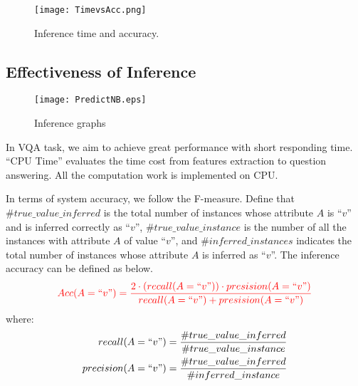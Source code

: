 \begin{figure}[h]
\begin{center}
\texttt{[image: TimevsAcc.png]}
\end{center}
\caption{Inference time and accuracy.}
\label{fig:TimevsAcc}
\end{figure}


\subsection{Effectiveness of Inference} 
\begin{figure}[tb!]
\centering
\texttt{[image: PredictNB.eps]}
\vspace{-2ex}
\caption{Inference graphs}
\vspace{-2ex}
\label{fig:inferGraph}
\end{figure}


In VQA task, we aim to achieve great performance with short responding time. “CPU Time” evaluates the time cost from features extraction to question answering. All the computation work is implemented on CPU.

In terms of system accuracy, we follow the F-measure. Define that $\#true\_value\_inferred$ is the total number of instances whose attribute $A$ is ``$v$'' and is inferred correctly as ``$v$'', $\#true\_value\_instance$ is the number of all the instances with attribute $A$ of value ``$v$'', and $\#inferred\_instances$ indicates the total number of instances whose attribute $A$ is inferred as ``$v$''. The inference accuracy can be defined as below. 
\begin{equation}
\scriptsize
\color{red}
Acc(A=``v") = \frac{2 \cdot (recall(A=``v")) \cdot presision (A = ``v")}{recall(A=``v") + presision (A = ``v")}
\end{equation}
where:
\begin{equation*}
\begin{split}
recall(A=``v") & = \frac{\#true\_value\_inferred}{\#true\_value\_instance} \\
precision(A=``v") & = 
\frac{\#true\_value\_inferred}{\#inferred\_instance}
\end{split}
\end{equation*}

